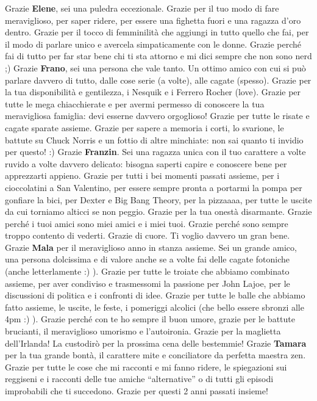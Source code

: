 \documentclass[10pt]{amsart}
\newcommand{\n}[1]{{\Large \bf #1}}
\begin{document}
Grazie \n{Elene}, sei una puledra eccezionale. Grazie per il tuo modo di fare meraviglioso, per saper ridere, per essere una fighetta fuori e una ragazza d'oro dentro. Grazie per il tocco di femminilità che aggiungi in tutto quello che fai, per il modo di parlare unico e avercela simpaticamente con le donne. Grazie perché fai di tutto per far star bene chi ti sta attorno e mi dici sempre che non sono nerd ;) Grazie 
\n{Frano}, sei una persona che vale tanto. Un ottimo amico con cui si può parlare davvero di tutto, dalle cose serie (a volte), alle cagate (spesso). Grazie per la tua disponibilità e gentilezza, i Nesquik e i Ferrero Rocher (love). Grazie per tutte le mega chiacchierate e per avermi permesso di conoscere la tua meravigliosa famiglia: devi esserne davvero orgoglioso! Grazie per tutte le risate e cagate sparate assieme. Grazie per sapere a memoria i corti, lo svarione, le battute su Chuck Norris e un fottio di altre minchiate: non sai quanto ti invidio per questo! :)
Grazie \n{Franzin}. Sei una ragazza unica con il tuo carattere a volte ruvido a volte davvero delicato: bisogna saperti capire e conoscere bene per apprezzarti appieno. Grazie per tutti i bei momenti passati assieme, per i cioccolatini a San Valentino, per essere sempre pronta a portarmi la pompa per gonfiare la bici, per Dexter e Big Bang Theory, per la pizzaaaa, per tutte le uscite da cui torniamo alticci se non peggio. Grazie per la tua onestà disarmante. Grazie perché i tuoi amici sono miei amici e i miei tuoi. Grazie perché sono sempre troppo contento di vederti. Grazie di cuore. Ti voglio davvero un gran bene. 
Grazie \n{Mala} per il meraviglioso anno in stanza assieme. Sei un grande amico, una persona dolcissima e di valore anche se a volte fai delle cagate fotoniche (anche letterlamente :) ). Grazie per tutte le troiate che abbiamo combinato assieme, per aver condiviso e trasmessomi la passione per John Lajoe, per le discussioni di politica e i confronti di idee. Grazie per tutte le balle che abbiamo fatto assieme, le uscite, le feste, i pomeriggi alcolici (che bello essere sbronzi alle 4pm :) ). Grazie perché con te ho sempre il buon umore, grazie per le battute brucianti, il meraviglioso umorismo e l'autoironia. Grazie per la maglietta dell'Irlanda! La custodirò per la prossima cena delle bestemmie!
Grazie \n{Tamara} per la tua grande bontà, il carattere mite e conciliatore da perfetta maestra zen. Grazie per tutte le cose che mi racconti e mi fanno ridere, le spiegazioni sui reggiseni e i racconti delle tue amiche ``alternative'' o di tutti gli episodi improbabili che ti succedono. Grazie per questi 2 anni passati insieme!\\
\end{document}
